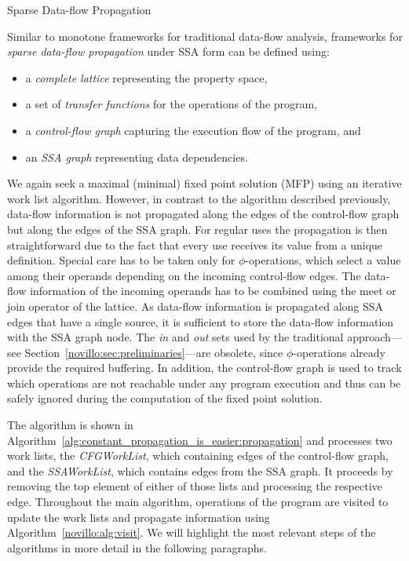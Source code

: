\begin{algorithm}[t!]
  \caption{Sparse Data-flow Propagation}
  \label{alg:constant_propagation_is_easier:propagation}
\end{algorithm}

Similar to monotone frameworks for traditional data-flow analysis, frameworks
for \emph{sparse data-flow propagation} under SSA form can be defined using:
\begin{itemize}
  \item a \emph{complete lattice} representing the property space,
  \item a set of \emph{transfer functions} for the operations of the program,
  \item a \emph{control-flow graph} capturing the execution flow of the program, and
  \item an \emph{SSA graph} representing data dependencies.
\end{itemize}
We again seek a maximal (minimal) fixed point solution (MFP) using an iterative
work list
algorithm. However, in contrast to the algorithm described previously, data-flow
information is not propagated along the edges of the control-flow graph but
along the edges of the SSA graph. For regular uses the propagation is then
straightforward due
to the fact that every use receives its value from a unique definition. Special
care has to be taken only for $\phi$-operations, which select a value among
their operands depending on the incoming control-flow edges. The data-flow
information of the
incoming operands has to be combined using the meet or join operator of the
lattice. As data-flow information is propagated along SSA edges that have a
single source, it is sufficient to store the data-flow information with the SSA
graph
node. The \emph{in} and \emph{out} sets used by the traditional approach---see
Section~\ref{novillo:sec:preliminaries}---are obsolete, since
$\phi$-operations already provide the required buffering.
In addition, the
control-flow graph is used to track which operations are not reachable under any
program execution and thus can be safely ignored during the computation of the
fixed point solution.

\medskip

The algorithm is shown in 
Algorithm~\ref{alg:constant_propagation_is_easier:propagation} and
processes two work lists, the \emph{CFGWorkList}, which containing edges
of the control-flow graph, and the \emph{SSAWorkList}, which contains edges
from the SSA graph.
It proceeds by removing the top element of either of those lists and
processing the respective edge.
Throughout the main algorithm, operations of
the program are visited to update the work lists and propagate
information using Algorithm~\ref{novillo:alg:visit}. We will highlight
the most relevant steps of the algorithms in more detail in the following
paragraphs.

